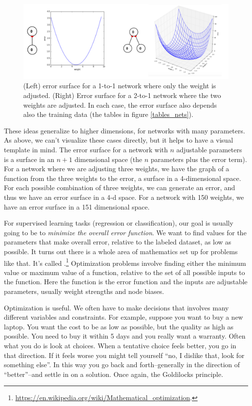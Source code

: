 \begin{figure}[h]
\centering
\includegraphics[scale=.5]{./images/ErrorSurfaces.png}
\caption[Jeff Yoshimi.]{(Left) error surface for a 1-to-1 network where only the weight is adjusted. (Right) Error surface for a 2-to-1 network where the two weights are adjusted. In each case, the error surface also depends also the training data (the tables in figure \ref{tables_nets}). }
\label{error_surfaces}
\end{figure}

These ideas generalize to higher dimensions, for networks with many parameters. As above, we can't visualize these cases directly, but it helps to have a visual template in mind. The error surface for a network with $n$ adjustable parameters is a surface in an $n+1$ dimensional space (the $n$ parameters plus the error term). For a network where we are adjusting three weights, we have the graph of a function from the three weights to the error, \ie a surface in a 4-dimensional space. For each possible combination of three weights, we can generate an error, and thus we have an error surface in a 4-d space. For a network with 150 weights, we have an error surface in a 151 dimensional space.

For supervised learning tasks (regression or classification), our goal is usually going to be to \emph{minimize the overall error function}. We want to find values for the parameters that make overall error, relative to the labeled dataset, as low as possible. It turns out there is a whole area of mathematics set up for problems like that. It's called .\footnote{\url{https://en.wikipedia.org/wiki/Mathematical_optimization}.} Optimization problems involve finding either the minimum value or maximum value of a function, relative to the set of all possible inputs to the function. Here the function is the error function and the inputs are adjustable parameters, usually weight strengths and node biases. 

Optimization is useful. We often have to make decisions that involves many different variables and constraints. For example, suppose you want to buy a new laptop. You want the cost to be as low as possible, but the quality as high as possible. You need to buy it within 5 days and you really want a warranty. Often what you do is look at choices. When a tentative choice feels  better, you go in that direction. If it feels worse  you might tell yourself  ``no, I dislike that, look for something else''. In this way you go back and forth--generally in the direction of ``better''--and settle in on a solution. Once again, the Goldilocks principle. 

